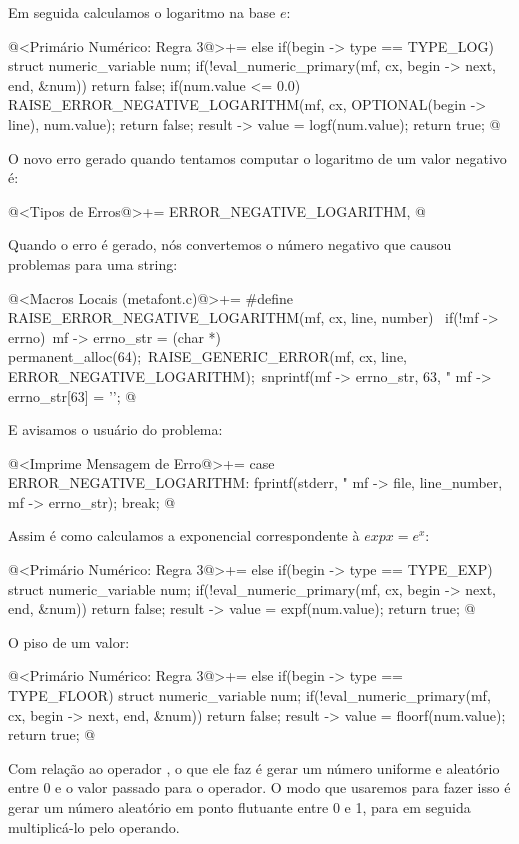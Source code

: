 Em seguida calculamos o logaritmo na base $e$:

\iniciocodigo
@<Primário Numérico: Regra 3@>+=
else if(begin -> type == TYPE_LOG){
  struct numeric_variable num;
  if(!eval_numeric_primary(mf, cx, begin -> next, end, &num))
    return false;
  if(num.value <= 0.0){
    RAISE_ERROR_NEGATIVE_LOGARITHM(mf, cx, OPTIONAL(begin -> line),
                                   num.value);
    return false;
  }
  result -> value = logf(num.value);
  return true;
}
@
\fimcodigo

O novo erro gerado quando tentamos computar o logaritmo de um valor
negativo é:

\iniciocodigo
@<Tipos de Erros@>+=
ERROR_NEGATIVE_LOGARITHM,
@
\fimcodigo

Quando o erro é gerado, nós convertemos o número negativo que causou
problemas para uma string:

\iniciocodigo
@<Macros Locais (metafont.c)@>+=
#define RAISE_ERROR_NEGATIVE_LOGARITHM(mf, cx, line, number) {\
  if(!mf -> errno){\
    mf -> errno_str = (char *) permanent_alloc(64);\
    RAISE_GENERIC_ERROR(mf, cx, line, ERROR_NEGATIVE_LOGARITHM);\
    snprintf(mf -> errno_str, 63, "%
    mf -> errno_str[63] = '\0';}}
@
\fimcodigo

E avisamos o usuário do problema:

\iniciocodigo
@<Imprime Mensagem de Erro@>+=
case ERROR_NEGATIVE_LOGARITHM:
  fprintf(stderr, "%
          mf -> file, line_number, mf -> errno_str);
  break;
@
\fimcodigo

Assim é como calculamos a exponencial correspondente à $exp x = e^x$:

\iniciocodigo
@<Primário Numérico: Regra 3@>+=
else if(begin -> type == TYPE_EXP){
  struct numeric_variable num;
  if(!eval_numeric_primary(mf, cx, begin -> next, end, &num))
    return false;
  result -> value = expf(num.value);
  return true;
}
@
\fimcodigo

O piso de um valor:

\iniciocodigo
@<Primário Numérico: Regra 3@>+=
else if(begin -> type == TYPE_FLOOR){
  struct numeric_variable num;
  if(!eval_numeric_primary(mf, cx, begin -> next, end, &num))
    return false;
  result -> value = floorf(num.value);
  return true;
}
@
\fimcodigo

Com relação ao operador , o que ele faz é
gerar um número uniforme e aleatório entre 0 e o valor passado para o
operador. O modo que usaremos para fazer isso é gerar um número
aleatório em ponto flutuante entre 0 e 1, para em seguida
multiplicá-lo pelo operando.

